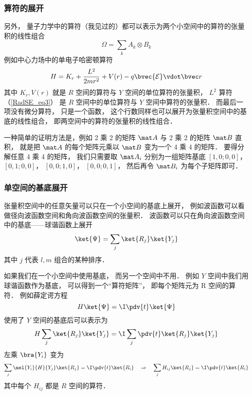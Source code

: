 \subsubsection{算符的展开}
另外， 量子力学中的算符（我见过的）都可以表示为两个小空间中的算符的张量积的线性组合
\begin{equation}
\Omega = \sum_k A_k \otimes B_k
\end{equation}
例如中心力场中的单电子哈密顿算符
\begin{equation}
H = K_r + \frac{L^2}{2mr^2} + V(r) - q\bvec{\mathcal{E}} \vdot \bvec r
\end{equation}
其中 $K_r, V(r)$ 就是 $R$ 空间的算符与 $Y$ 空间的单位算符的张量积， $L^2$ 算符（\autoref{RadSE_eq3}） 是 $R$ 空间中的单位算符与 $Y$ 空间中算符的张量积． 而最后一项没有微分算符， 只是一个函数， 这个行数同样也可以展开为张量积空间中的基底的线性组合， 即两空间中的算符的张量积的线性组合．

一种简单的证明方法是，例如 2 乘 2 的矩阵 $\mat A$ 与 2 乘 2 的矩阵 $\mat B$ 直积， 就是把 $\mat A$ 的每个矩阵元乘以 $\mat B$ 变为一个 4 乘 4 的矩阵． 要得分解任意 4 乘 4 的矩阵， 我们只需要取 $\mat A_i$ 分别为一组矩阵基底 $[1, 0; 0, 0]$， $[0, 1; 0, 0]$， $[0, 0; 1, 0]$， $[0, 0; 0, 1]$， 然后再令 $\mat B_i$ 为每个子矩阵即可．

\subsubsection{单空间的基底展开}
张量积空间中的任意矢量可以只在一个小空间的基底上展开， 例如波函数可以看做径向波函数空间和角向波函数空间的张量积． 波函数可以只在角向波函数空间中的基底——球谐函数上展开
\begin{equation}
\ket{\Psi} = \sum_j \ket{R_j}\ket{Y_j}
\end{equation}
其中 $j$ 代表 $l, m$ 组合的某种排序．

如果我们在一个小空间中使用基底， 而另一个空间中不用． 例如 $Y$ 空间中我们用球谐函数作为基底， 可以得到一个“算符矩阵”， 即每个矩阵元为 R 空间的算符． 例如薛定谔方程
\begin{equation}
H \ket{\Psi} = \I \pdv{t}  \ket{\Psi}
\end{equation}
使用了 $Y$ 空间的基底后可以表示为
\begin{equation}
H \sum_j \ket{R_j}\ket{Y_j} =  \I  \sum_j\pdv{t}  \ket{R_j}\ket{Y_j}
\end{equation}
左乘 $\bra{Y_i}$ 变为
\begin{equation}
\sum_j \mel{Y_i}{H}{Y_j} \ket{R_j} =  \I  \pdv{t}  \ket{R_i}
\quad\Rightarrow\quad
\sum_j H_{ij} \ket{R_j} =  \I  \pdv{t}  \ket{R_i}
\end{equation}
其中每个 $H_{ij}$ 都是 $R$ 空间的算符．

